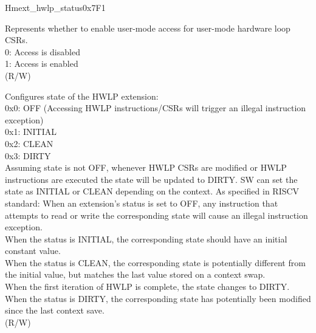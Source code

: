 \begin{register}{H}{mext\_hwlp\_status}{0x7F1}\label{regdesc:MEXT_HWLP_STATUS}%
%
%
%
\regnewline%
\begin{regdesc}\begin{reglist}
\label{fielddesc:MEXT_HWLP_URW}\item [URW] Represents whether to enable user-mode access for user-mode hardware loop CSRs. \\
0: Access is disabled\\
1: Access is enabled\\
(R/W)
\label{fielddesc:MEXT_HWLP_STATE}\item [STATE] Configures state of the HWLP extension: \\
0x0: OFF (Accessing HWLP instructions/CSRs will trigger an illegal instruction exception) \\
0x1: INITIAL \\
0x2: CLEAN \\
0x3: DIRTY \\
Assuming state is not OFF, whenever HWLP CSRs are modified or HWLP instructions are executed the state will be updated to DIRTY. SW can set the state as INITIAL or CLEAN depending on the context. As specified in RISCV standard: When an extension’s status is set to OFF, any instruction that attempts to read or write the corresponding state will cause an illegal instruction exception. \\
When the status is INITIAL, the corresponding state should have an initial constant value. \\
When the status is CLEAN, the corresponding state is potentially different from the initial value, but matches the last value stored on a context swap.\\
When the first iteration of HWLP is complete, the state changes to DIRTY. When the status is DIRTY, the corresponding state has potentially been modified since the last context save. \\
(R/W)
\end{reglist}\end{regdesc}
\end{register}

